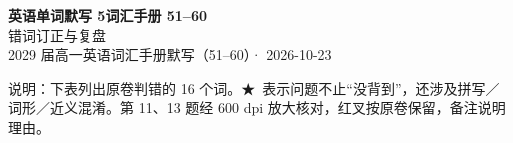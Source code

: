 \documentclass[11pt,a4paper]{article}
\newcommand{\STAR}{\textcolor{wrongred}{\starfont ★}}
\begin{document}
\begin{center}
{\LARGE\bfseries 英语单词默写 5\quad 词汇手册 51--60}\\[0.25em]
{\large 错词订正与复盘}\\[0.35em]
{\footnotesize 2029 届高一英语词汇手册默写（51--60）· 2026-10-23}
\end{center}

\vspace{-0.2em}
\noindent{\color{rulegray}\rule{\textwidth}{0.8pt}}

\vspace{0.7em}
\noindent{}

\vspace{0.8em}
\noindent 说明：下表列出原卷判错的 16 个词。\STAR\ 表示问题不止“没背到”，还涉及拼写／词形／近义混淆。第 11、13 题经 600 dpi 放大核对，红叉按原卷保留，备注说明理由。
\end{document}
